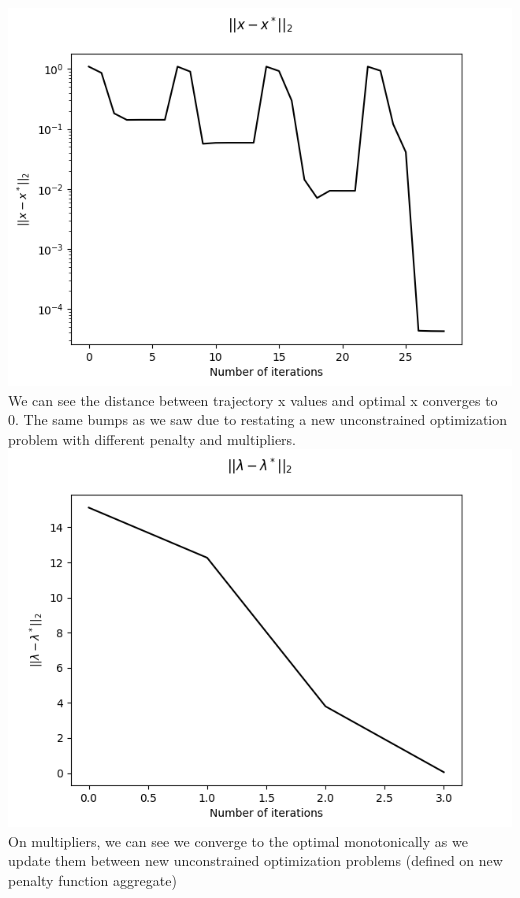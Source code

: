 \documentclass[12pt]{article}
\begin{document}
\subsubsection{}
\includegraphics[scale=0.5]{hw4/plots/plot_6.png}\\
We can see the distance between trajectory x values and optimal x converges to 0. The same bumps as we saw due to restating a new unconstrained optimization problem with different penalty and multipliers.\\
\includegraphics[scale=0.5]{hw4/plots/plot_7.png}\\
On multipliers, we can see we converge to the optimal monotonically as we update them between new unconstrained optimization problems (defined on new penalty function aggregate)\\
\end{document}
